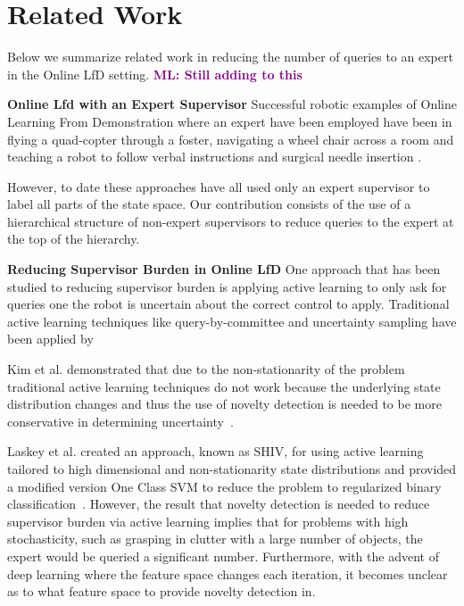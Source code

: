 \documentclass[10pt, conference]{ieeeconf}      %
\newcommand{\mlnote}[1]{\ifthenelse{ \boolean{include-notes}}%
 {\textcolor{purple}{\textbf{ML: #1}}}{}}
\begin{document}
\section{Related Work}
Below we summarize related work in reducing the number of queries to an expert in the Online LfD setting.\mlnote{Still adding to this}

\noindent \textbf{Online Lfd with an Expert Supervisor}
Successful robotic examples of Online Learning From Demonstration where an expert have been employed have been in flying a quad-copter through a foster, navigating a wheel chair across a room and teaching a robot to follow verbal instructions and surgical needle insertion \cite{ross2013learning, kim2013maximum, duvallet2013imitation, laskey}. 

However, to date these approaches have all used only an expert supervisor to label all parts of the state space. Our contribution consists of the use of a hierarchical structure of non-expert supervisors to reduce queries to the expert at the top of the hierarchy. 

\noindent\textbf{Reducing Supervisor Burden in Online LfD} One approach that has been studied to reducing supervisor burden is applying active learning to only ask for queries one the robot is uncertain about the correct control to apply. Traditional active learning techniques like query-by-committee and uncertainty sampling have been applied by \cite{chernova2009interactive,judah2011active,grollman2007dogged}

Kim et al. demonstrated that due to the non-stationarity of the problem traditional active learning techniques do not work because the underlying state distribution changes and thus the use of novelty detection is needed to be more conservative in determining uncertainty~\cite{kim2013maximum}.

Laskey et al. created an approach, known as SHIV, for using active learning tailored to high dimensional and non-stationarity state distributions and  provided a modified version One Class SVM to reduce the problem to regularized binary classification~\cite{laskey}. However, the result that novelty detection is needed to reduce supervisor burden via active learning implies that for problems with high stochasticity, such as grasping in clutter with a large number of objects, the expert would be queried a significant number. Furthermore, with the advent of deep learning where the feature space changes each iteration, it becomes unclear as to what feature space to provide novelty detection in.
\end{document}
